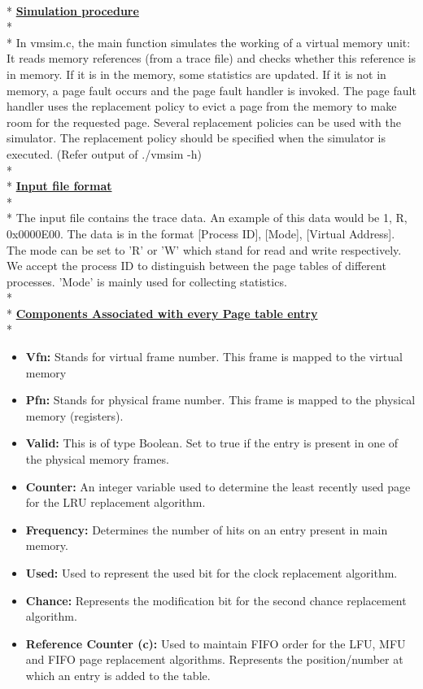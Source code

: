 \documentclass[12pt, oneside, a4paper]{report}
\begin{document}
\\*
\underline{\textbf{Simulation procedure}}
\\*
\\*
In vmsim.c, the main function simulates the working of a virtual memory unit: It reads memory references (from a trace file) and checks whether this reference is in memory. If it is in the memory, some statistics are updated. If it is not in memory, a page fault occurs and the page fault handler is invoked. The page fault handler uses the replacement policy to evict a page from the memory to make room for the requested page. Several replacement policies can be used with the simulator. The replacement policy should be specified when the simulator is executed. (Refer output of ./vmsim -h)
\\*
\\*
\underline{\textbf{Input file format}}
\\*
\\*
The input file contains the trace data. An example of this data would be 1, R, 0x0000E00. The data is in the format [Process ID], [Mode], [Virtual Address]. The mode can be set to 'R' or 'W' which stand for read and write respectively. We accept the process ID to distinguish between the page tables of different processes. 'Mode' is mainly used for collecting statistics.
\\*
\\*
\underline{\textbf{Components Associated with every Page table entry}}
\\*
\begin{itemize}
\item \textbf{Vfn:} Stands for virtual frame number. This frame is mapped to the virtual memory
\item \textbf{Pfn:} Stands for physical frame number. This frame is mapped to the physical memory (registers).
\item \textbf{Valid:} This is of type Boolean. Set to true if the entry is present in one of the physical memory frames.
\item \textbf{Counter:} An integer variable used to determine the least recently used page for the LRU replacement algorithm.
\item \textbf{Frequency:} Determines the number of hits on an entry present in main memory.
\item \textbf{Used:} Used to represent the used bit for the clock replacement algorithm.
\item \textbf{Chance:} Represents the modification bit for the second chance replacement algorithm.
\item \textbf{Reference Counter (c):} Used to maintain FIFO order for the LFU, MFU and FIFO page replacement algorithms. Represents the position/number at which an entry is added to the table.
\end{itemize}
\newpage
\end{document}
